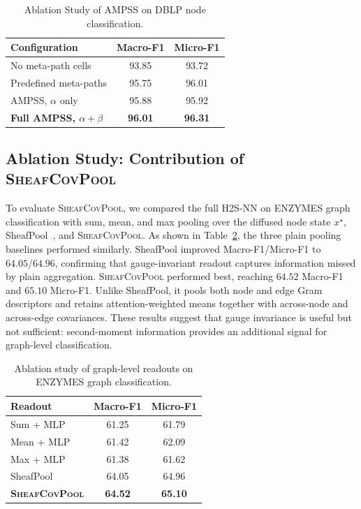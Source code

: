 \documentclass[sigconf,anonymous,review]{acmart}
\newcommand{\method}{\textsc{H2S-NN}}
\newcommand{\ampss}{\textsc{AMPSS}}
\newcommand{\sheafcovpool}{\textsc{SheafCovPool}}
\begin{document}
\begin{table}[t]
  \centering
  \caption{Ablation Study of \ampss{} on DBLP node classification.}
  \label{tab:ablation-schema}
  \small
  \begin{tabular}{lcc}
    \toprule
    \textbf{Configuration} & Macro-F1 & Micro-F1 \\
    \midrule
    No meta-path cells & 93.85 & 93.72 \\
    Predefined meta-paths & 95.75 & 96.01 \\
    \ampss{}, $\alpha$ only & 95.88 & 95.92 \\
    \textbf{Full \ampss{}, $\alpha+\beta$} & \textbf{96.01} & \textbf{96.31} \\
    \bottomrule
  \end{tabular}
\end{table}

\subsection{Ablation Study: Contribution of {\sheafcovpool{}}}

To evaluate \sheafcovpool{}, we compared the full \method{} on ENZYMES graph classification with sum, mean, and max pooling over the diffused node state \(x^\star\), SheafPool~\cite{braithwaite2024heterogeneous}, and \sheafcovpool{}. As shown in Table~\ref{tab:ablation-pooling}, the three plain pooling baselines performed similarly. SheafPool improved Macro-F1/Micro-F1 to \(64.05/64.96\), confirming that gauge-invariant readout captures information missed by plain aggregation. \sheafcovpool{} performed best, reaching \(64.52\) Macro-F1 and \(65.10\) Micro-F1. Unlike SheafPool, it pools both node and edge Gram descriptors and retains attention-weighted means together with across-node and across-edge covariances. These results suggest that gauge invariance is useful but not sufficient: second-moment information provides an additional signal for graph-level classification.

\begin{table}[t]
  \centering
  \caption{Ablation study of graph-level readouts on ENZYMES graph classification.}
  \label{tab:ablation-pooling}
  \small
  \begin{tabular}{lcc}
    \toprule
    \textbf{Readout} & Macro-F1 & Micro-F1 \\
    \midrule
    Sum + MLP & 61.25 & 61.79 \\
    Mean + MLP & 61.42 & 62.09 \\
    Max + MLP & 61.38 & 61.62 \\
    SheafPool & 64.05 & 64.96 \\
    \textbf{\sheafcovpool{}} & \textbf{64.52} & \textbf{65.10} \\
    \bottomrule
  \end{tabular}
\end{table}
\end{document}

